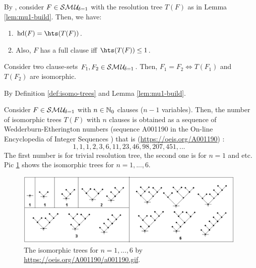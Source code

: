 \documentclass{report}
\begin{document}
\begin{lem}\label{lem:smu1hs1}
By \cite{GwynneKullmann2013GoodRepresentations}, consider $F \in \mathcal{S}\mathcal{M\hspace{0.8pt}U}_{\!\delta=1}$ with the resolution tree $T(F)$ as in Lemma \ref{lem:mu1-build}. Then, we have:
  \begin{enumerate}
  \item $\hardness(F) = \hts(T(F))$.
  \item Also, $F$ has a full clause iff $\hts(T(F)) \le 1$.
  \end{enumerate}
\end{lem}

\begin{lem}\label{lem:mu1-iso}
Consider two clause-sets $F_1,F_2 \in \mathcal{S}\mathcal{M\hspace{0.8pt}U}_{\!\delta=1}$. Then, $F_1=F_2 \iff T(F_1) $ and $T(F_2)$ are isomorphic.
\end{lem}    
\begin{prf}
By Definition \ref{def:isomo-trees} and Lemma \ref{lem:mu1-build}.
\end{prf}                                                                                                     
                                                                                                                                                                                                                                           
\begin{lem}\label{lem:mu1-iso-num}
Consider $F \in \mathcal{S}\mathcal{M\hspace{0.8pt}U}_{\!\delta=1}$ with $n \in \mathbb{N}_0$ clauses ($n-1$ variables). Then, the number of isomorphic trees $T(F)$ with $n$ clauses is obtained as a sequence of Wedderburn-Etherington numbers (sequence A001190 in the On-line Encyclopedia of Integer Sequences \cite{Sloane2008OEIS}) that is (\url{https://oeis.org/A001190}) :
\begin{displaymath}
 1, 1, 1, 2, 3, 6, 11, 23, 46, 98, 207, 451, ...
\end{displaymath}
The first number is for trivial resolution tree, the second one is for $n=1$ and etc. Pic \ref{fig:isotree} shows the isomorphic trees for $n=1,..., 6$.
 \begin{figure}
   \begin{center}
   \includegraphics[scale =0.45]{a001190.png}
   \caption{The isomorphic trees for $n=1,..., 6$ by \url{https://oeis.org/A001190/a001190.gif}.}
   \label{fig:isotree}
   \end{center}
   \end{figure}
\end{lem}   
                             
\end{document}
